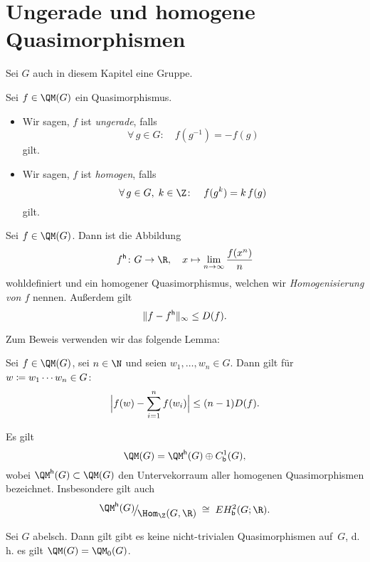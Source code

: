\chapter{Ungerade und homogene Quasimorphismen}
\begin{thSetup}
    Sei $G$ auch in diesem Kapitel eine Gruppe.
\end{thSetup}

\begin{thDef}
    Sei $f\in\QM(G)$ ein Quasimorphismus.
    \begin{itemize}
        \item
            Wir sagen, $f$ ist \emph{ungerade}, falls
            \[ \forall\,g\in G\colon\quad
                f(g^{-1}) = -f(g)
            \]
            gilt.
            
        \item
            Wir sagen, $f$ ist \emph{homogen}, falls
            \[ \forall\,g\in G,\;k\in\Z\colon\quad
                f(g^k) = k\,f(g)
            \]
            gilt.
    \end{itemize}
\end{thDef}

\begin{thProposition}[Homogenisierung]
    Sei $f\in\QM(G)$. Dann ist die Abbildung
    \[ f\homo \colon G \to \R, \quad
        x\mapsto \lim_{n\to\infty} \frac{f(x^n)}{n}
    \]
    wohldefiniert und ein homogener Quasimorphismus, welchen wir
    \emph{Homogenisierung von $f$} nennen. Außerdem gilt
    \[ \norm{f-f\homo}_\supr \leq D(f)  . \]
\end{thProposition}

Zum Beweis verwenden wir das folgende Lemma:

\begin{thLemma}
    Sei $f\in\QM(G)$, sei $n\in\N$ und seien
    $w_1,\dots,w_n\in G$. Dann gilt für $w\defeq w_1\cdots w_n\in G$:
    \[ \abs[\Big]{ f(w) - \isum^n f(w_i) } \leq (n-1) D(f)  . \]
\end{thLemma}

\begin{thKorollar}
    Es gilt
    \[ \QM(G) = \QM\homo(G) \oplus \Cb^1(G)  , \]
    wobei $\QM\homo(G) \subset \QM(G)$ den Untervekorraum aller homogenen
    Quasimorphismen bezeichnet. Insbesondere gilt auch
    \[ \Quot{\QM\homo(G)}{\Hom_\Z(G,\R)} \;\cong\; E\Hb^2(G;\R)  . \]
\end{thKorollar}

\begin{thKorollar}
    Sei $G$ abelsch. Dann gilt gibt es keine nicht-trivialen
    Quasimorphismen auf~$G$, d.\,h. es gilt $\QM(G) = \QM_0(G)$.
\end{thKorollar}
